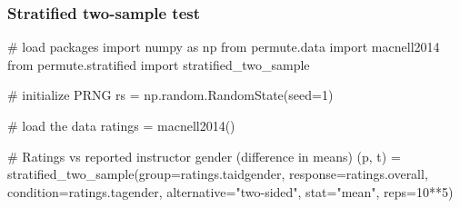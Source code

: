 \documentclass{beamer}
\newcommand{\todo}[1]{{\color{red}{TO DO: \sc #1}}}
\begin{document}

\begin{frame}[fragile]
\frametitle{Stratified two-sample test}
\begin{center}
\begin{python}
# load packages
import numpy as np
from permute.data import macnell2014
from permute.stratified import stratified_two_sample

# initialize PRNG
rs = np.random.RandomState(seed=1)

# load the data
ratings = macnell2014()

# Ratings vs reported instructor gender (difference in means)
(p, t) = stratified_two_sample(group=ratings.taidgender,
                               response=ratings.overall,
                               condition=ratings.tagender,
                               alternative="two-sided",
                               stat="mean", reps=10**5)
\end{python}
\end{center}
\end{frame}
\end{document}
